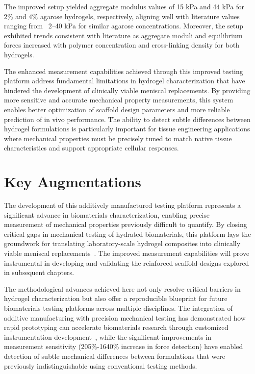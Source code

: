 The improved setup yielded aggregate modulus values of 15 kPa and 44 kPa for 2\% and 4\% agarose hydrogels, respectively, aligning well with literature values ranging from ~2--40 kPa for similar agarose concentrations\cite{gervaso2007effectgeometrical,huang2021ultrahighenergydissipation,huang2021ultrahighenergydissipation,jaidev2019surfacefunctionalization}. Moreover, the setup exhibited trends consistent with literature as aggregate moduli and equilibrium forces increased with polymer concentration and cross-linking density for both hydrogels.

The enhanced measurement capabilities achieved through this improved testing platform address fundamental limitations in hydrogel characterization that have hindered the development of clinically viable meniscal replacements. By providing more sensitive and accurate mechanical property measurements, this system enables better optimization of scaffold design parameters and more reliable prediction of in vivo performance. The ability to detect subtle differences between hydrogel formulations is particularly important for tissue engineering applications where mechanical properties must be precisely tuned to match native tissue characteristics and support appropriate cellular responses.

\section{Key Augmentations}

The development of this additively manufactured testing platform represents a significant advance in biomaterials characterization, enabling precise measurement of mechanical properties previously difficult to quantify. By closing critical gaps in mechanical testing of hydrated biomaterials, this platform lays the groundwork for translating laboratory-scale hydrogel composites into clinically viable meniscal replacements~\cite{patel2019systematicreview,luis20203dprinted,mauck2002influenceseeding,nakagawa2019longtermevaluation,nguyen2012cartilagelikemechanical,ronca2023developmenthighly,fitzgerald2015tunablestress}. The improved measurement capabilities will prove instrumental in developing and validating the reinforced scaffold designs explored in subsequent chapters.

The methodological advances achieved here not only resolve critical barriers in hydrogel characterization but also offer a reproducible blueprint for future biomaterials testing platforms across multiple disciplines. The integration of additive manufacturing with precision mechanical testing has demonstrated how rapid prototyping can accelerate biomaterials research through customized instrumentation development~\cite{korhonen2002comparisonequilibrium,seitz2013stressrelaxationresponse,patel2019systematicreview, schinagl1997depthdependentconfined, schinagl1996videomicroscopy,daszkiewicz2021biomechanicsmedial,danso2014comparisonnonlinear}, while the significant improvements in measurement sensitivity (205\%-1640\% increase in force detection) have enabled detection of subtle mechanical differences between formulations that were previously indistinguishable using conventional testing methods.

